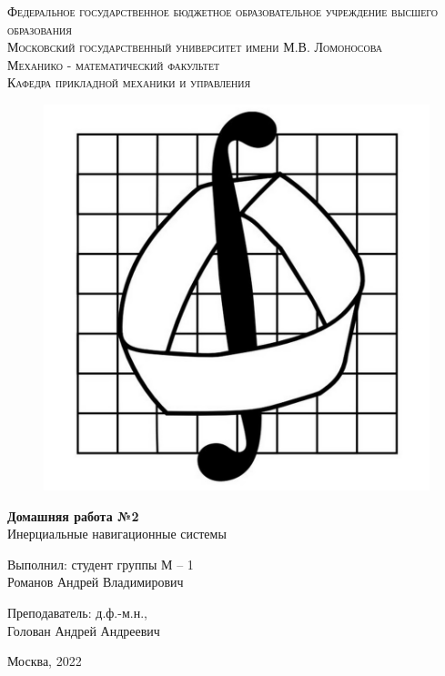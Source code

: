 \documentclass[a4paper,14pt]{article}
\theoremstyle{plain} %
\theoremstyle{definition} %
\theoremstyle{remark} %
\begin{document}
\begin{center}
    {\textsc{Федеральное государственное бюджетное образовательное
            учреждение высшего образования
        }}\\
    {\textsc{Московский государственный университет имени М.В. Ломоносова
    }} \\
    \vspace{0.2cm}
    {\textsc{Механико - математический факультет}}\\
    \vspace{0.2cm}
    {\textsc{Кафедра прикладной механики и управления}}\\
    \hfill \break
    \begin{figure}[h!]
        \centering
        \includegraphics[width=0.30\linewidth]{emblema}
        \label{fig:emblema}
    \end{figure}
    \hfill \break
    \hfill \break
    \large{\textbf{Домашняя работа №2}\\
        \hfill \break Инерциальные навигационные системы
    }
\end{center}

\hfill \break
\hfill \break
\begin{flushright}
    {
        Выполнил: студент группы М -- 1 \\ Романов Андрей Владимирович}
\end{flushright}

\begin{flushright}
    {
        Преподаватель: д.ф.-м.н., \\ Голован Андрей Андреевич}
\end{flushright}
\hfill \break
\hfill \break
\begin{center} {Москва, 2022} \end{center}
\end{document}
